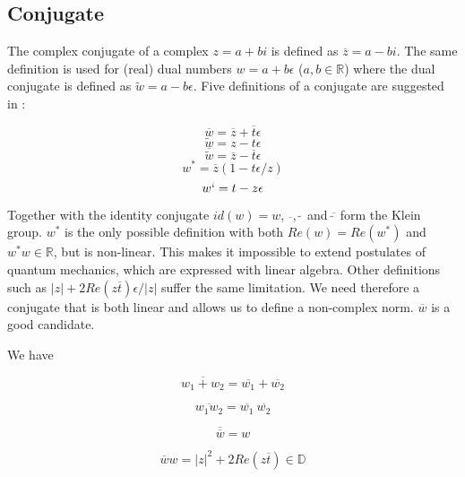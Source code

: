 \documentclass{article}
\newcommand{\R}{\mathbb{R}}
\newcommand{\D}{\mathbb{D}}
\newcommand{\e}{\epsilon}
\newcommand{\til}{\widetilde}
\renewcommand{\bar}{\overline}
\begin{document}
\subsection{Conjugate}

The complex conjugate of a complex $z = a + bi$ is defined as $\bar{z} = a - bi$. The same definition is used for (real) dual numbers $w = a + b\e$ ($a, b \in \R$) where the dual conjugate is defined as $\til{w} = a - b \e$. Five definitions of a conjugate are suggested in \cite{messelmi2015}:

\begin{equation}
\bar{w} = \bar{z} + \bar{t}\e
\end{equation}
\begin{equation}
\til{w} = z - t\e
\end{equation}
\begin{equation}
\bar{\til{w}} = \bar{z} - \bar{t}\e
\end{equation}
\begin{equation}
w^* = \bar{z}(1-t\e/z)
\end{equation}
\begin{equation}
w` = t - z \e
\end{equation}

Together with the identity conjugate $id(w) = w$, $\bar{~}$, $\til{~}$ and $\bar{\til{~}}$ form the Klein group. $w^*$ is the only possible definition with both $Re(w) = Re(w^*)$ and $w^*w \in \R$, but is non-linear. This makes it impossible to extend postulates of quantum mechanics, which are expressed with linear algebra. Other definitions such as $|z| + 2Re(z\bar{t})\e/|z|$ suffer the same limitation. We need therefore a conjugate that is both linear and allows us to define a non-complex norm. $\bar{w}$ is a good candidate.

We have

\begin{equation}
\bar{w_1 + w_2} = \bar{w_1} + \bar{w_2}
\end{equation}

\begin{equation}
\bar{w_1  w_2} = \bar{w_1} ~ \bar{w_2}
\end{equation}

\begin{equation}
\bar{\bar{w}} = w
\end{equation}

\begin{equation}
\bar{w}w = |z|^2 + 2 Re(z\bar{t}) \in \D
\end{equation}
\end{document}
